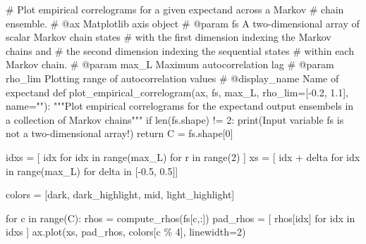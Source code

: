 \documentclass[
  letterpaper,
  DIV=11,
  numbers=noendperiod]{scrartcl}
\newenvironment{Shaded}{\begin{snugshade}}{\end{snugshade}}
\newcommand{\BuiltInTok}[1]{\textcolor[rgb]{0.00,0.23,0.31}{#1}}
\newcommand{\CommentTok}[1]{\textcolor[rgb]{0.37,0.37,0.37}{#1}}
\newcommand{\ControlFlowTok}[1]{\textcolor[rgb]{0.00,0.23,0.31}{#1}}
\newcommand{\DecValTok}[1]{\textcolor[rgb]{0.68,0.00,0.00}{#1}}
\newcommand{\FloatTok}[1]{\textcolor[rgb]{0.68,0.00,0.00}{#1}}
\newcommand{\KeywordTok}[1]{\textcolor[rgb]{0.00,0.23,0.31}{#1}}
\newcommand{\NormalTok}[1]{\textcolor[rgb]{0.00,0.23,0.31}{#1}}
\newcommand{\OperatorTok}[1]{\textcolor[rgb]{0.37,0.37,0.37}{#1}}
\newcommand{\StringTok}[1]{\textcolor[rgb]{0.13,0.47,0.30}{#1}}
\begin{document}
\begin{Shaded}
\begin{Highlighting}[]

\CommentTok{\# Plot empirical correlograms for a given expectand across a Markov }
\CommentTok{\# chain ensemble.}
\CommentTok{\# @ax Matplotlib axis object}
\CommentTok{\# @param fs A two{-}dimensional array of scalar Markov chain states }
\CommentTok{\#           with the first dimension indexing the Markov chains and }
\CommentTok{\#           the second dimension indexing the sequential states }
\CommentTok{\#           within each Markov chain.}
\CommentTok{\# @param max\_L Maximum autocorrelation lag}
\CommentTok{\# @param rho\_lim Plotting range of autocorrelation values}
\CommentTok{\# @display\_name Name of expectand}
\KeywordTok{def}\NormalTok{ plot\_empirical\_correlogram(ax,}
\NormalTok{                               fs,}
\NormalTok{                               max\_L,}
\NormalTok{                               rho\_lim}\OperatorTok{=}\NormalTok{[}\OperatorTok{{-}}\FloatTok{0.2}\NormalTok{, }\FloatTok{1.1}\NormalTok{],}
\NormalTok{                               name}\OperatorTok{=}\StringTok{""}\NormalTok{):}
  \CommentTok{"""Plot empirical correlograms for the expectand output ensembels in a}
\CommentTok{     collection of Markov chains"""}
  \ControlFlowTok{if} \BuiltInTok{len}\NormalTok{(fs.shape) }\OperatorTok{!=} \DecValTok{2}\NormalTok{:}
    \BuiltInTok{print}\NormalTok{(}\StringTok{\textquotesingle{}Input variable \textasciigrave{}fs\textasciigrave{} is not a two{-}dimensional array!\textquotesingle{}}\NormalTok{)}
    \ControlFlowTok{return}
\NormalTok{  C }\OperatorTok{=}\NormalTok{ fs.shape[}\DecValTok{0}\NormalTok{]}
  
\NormalTok{  idxs }\OperatorTok{=}\NormalTok{ [ idx }\ControlFlowTok{for}\NormalTok{ idx }\KeywordTok{in} \BuiltInTok{range}\NormalTok{(max\_L) }\ControlFlowTok{for}\NormalTok{ r }\KeywordTok{in} \BuiltInTok{range}\NormalTok{(}\DecValTok{2}\NormalTok{) ]}
\NormalTok{  xs }\OperatorTok{=}\NormalTok{ [ idx }\OperatorTok{+}\NormalTok{ delta }\ControlFlowTok{for}\NormalTok{ idx }\KeywordTok{in} \BuiltInTok{range}\NormalTok{(max\_L) }\ControlFlowTok{for}\NormalTok{ delta }\KeywordTok{in}\NormalTok{ [}\OperatorTok{{-}}\FloatTok{0.5}\NormalTok{, }\FloatTok{0.5}\NormalTok{]]}
  
\NormalTok{  colors }\OperatorTok{=}\NormalTok{ [dark, dark\_highlight, mid, light\_highlight]}
  
  \ControlFlowTok{for}\NormalTok{ c }\KeywordTok{in} \BuiltInTok{range}\NormalTok{(C):}
\NormalTok{    rhos }\OperatorTok{=}\NormalTok{ compute\_rhos(fs[c,:])}
\NormalTok{    pad\_rhos }\OperatorTok{=}\NormalTok{ [ rhos[idx] }\ControlFlowTok{for}\NormalTok{ idx }\KeywordTok{in}\NormalTok{ idxs ]}
\NormalTok{    ax.plot(xs, pad\_rhos, colors[c }\OperatorTok{\%} \DecValTok{4}\NormalTok{], linewidth}\OperatorTok{=}\DecValTok{2}\NormalTok{)}
  

\end{Highlighting}
\end{Shaded}
\end{document}
